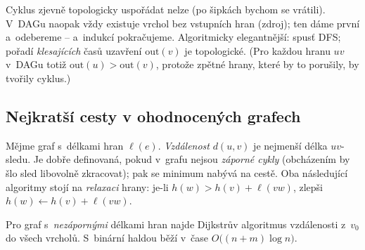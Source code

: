 \documentclass[11pt,a4paper]{article}
\begin{document}
\begin{intuice}
Cyklus zjevně topologicky uspořádat nelze (po šipkách bychom se vrátili). V~DAGu naopak vždy existuje vrchol bez vstupních hran (zdroj); ten dáme první a~odebereme -- a~indukcí pokračujeme. Algoritmicky elegantnější: spusť DFS; pořadí \emph{klesajících} časů uzavření $\mathrm{out}(v)$ je topologické. (Pro každou hranu $uv$ v~DAGu totiž $\mathrm{out}(u)>\mathrm{out}(v)$, protože zpětné hrany, které by to porušily, by tvořily cyklus.)
\end{intuice}

\begin{center}
\end{center}

\subsection{Nejkratší cesty v ohodnocených grafech}

Mějme graf s~délkami hran $\ell(e)$. \emph{Vzdálenost} $d(u,v)$ je nejmenší délka $uv$-sledu. Je dobře definovaná, pokud v~grafu nejsou \emph{záporné cykly} (obcházením by šlo sled libovolně zkracovat); pak se minimum nabývá na cestě. Oba následující algoritmy stojí na \emph{relaxaci} hrany: je-li $h(w)>h(v)+\ell(vw)$, zlepši $h(w)\leftarrow h(v)+\ell(vw)$.

\begin{veta}
Pro graf s~\emph{nezápornými} délkami hran najde Dijkstrův algoritmus vzdálenosti z~$v_0$ do všech vrcholů. S~binární haldou běží v~čase $O\big((n+m)\log n\big)$.
\end{veta}
\end{document}
